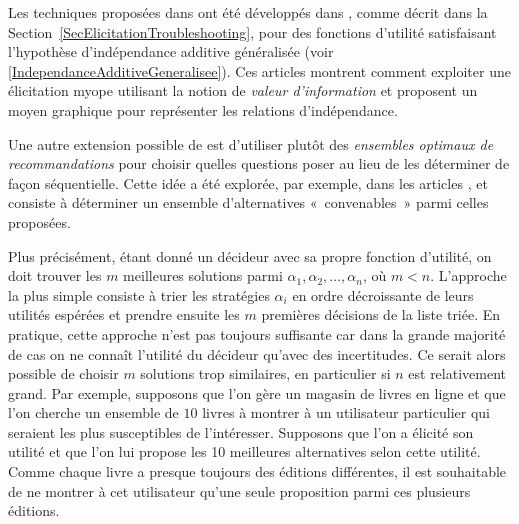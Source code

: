 \documentclass[a4paper,11pt]{article}
\theoremstyle{plain}
\theoremstyle{definition}
\begin{document}
Les techniques proposées dans \cite{chajewska_making_2000, boutilier_pomdp_2002} ont été développés dans \cite{braziunas_local_2005, Braziunas_2008}, comme décrit dans la Section~\ref{SecElicitationTroubleshooting}, pour des fonctions d'utilité satisfaisant l'hypothèse d'indépendance additive généralisée (voir \eqref{IndependanceAdditiveGeneralisee}). Ces articles montrent comment exploiter une élicitation myope utilisant la notion de \emph{valeur d'information} et proposent un moyen graphique pour représenter les relations d'indépendance.

Une autre extension possible de \cite{chajewska_making_2000, boutilier_pomdp_2002} est d'utiliser plutôt des \emph{ensembles optimaux de recommandations} pour choisir quelles questions poser au lieu de les déterminer de façon séquentielle. Cette idée a été explorée, par exemple, dans les articles \cite{price_optimal_2005, viappiani_optimal_2005}, et consiste à déterminer un ensemble d'alternatives «~convenables~» parmi celles proposées.

Plus précisément, étant donné un décideur avec sa propre fonction d'utilité, on doit trouver les $m$ meilleures solutions parmi $\alpha_1, \alpha_2, \dotsc, \alpha_n$, où $m < n$. L'approche la plus simple consiste à trier les stratégies $\alpha_i$ en ordre décroissante de leurs utilités espérées et prendre ensuite les $m$ premières décisions de la liste triée. En pratique, cette approche n'est pas toujours suffisante \cite{price_optimal_2005} car dans la grande majorité de cas on ne connaît l'utilité du décideur qu'avec des incertitudes. Ce serait alors possible de choisir $m$ solutions trop similaires, en particulier si $n$ est relativement grand. Par exemple, supposons que l'on gère un magasin de livres en ligne et que l'on cherche un ensemble de $10$ livres à montrer à un utilisateur particulier qui seraient les plus susceptibles de l'intéresser. Supposons que l'on a élicité son utilité et que l'on lui propose les 10 meilleures alternatives selon cette utilité. Comme chaque livre a presque toujours des éditions différentes, il est souhaitable de ne montrer à cet utilisateur qu'une seule proposition parmi ces plusieurs éditions.
\end{document}
